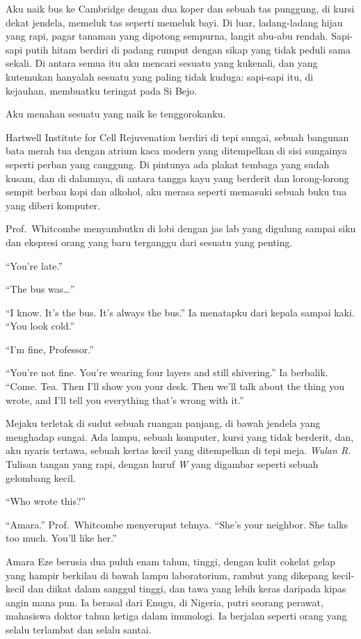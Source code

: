 \documentclass[11pt,twoside,openany]{book}
\makeatletter
\newcommand{\scenebreak}{\par\vspace{0.9em}{\centering\textsc{*\hspace{0.7em}*\hspace{0.7em}*}\par}\vspace{0.9em}\@afterindentfalse\@afterheading}
\makeatother
\begin{document}
Aku naik bus ke Cambridge dengan dua koper dan sebuah tas punggung, di kursi dekat jendela, memeluk tas seperti memeluk bayi. Di luar, ladang-ladang hijau yang rapi, pagar tanaman yang dipotong sempurna, langit abu-abu rendah. Sapi-sapi putih hitam berdiri di padang rumput dengan sikap yang tidak peduli sama sekali. Di antara semua itu aku mencari sesuatu yang kukenali, dan yang kutemukan hanyalah sesuatu yang paling tidak kuduga: sapi-sapi itu, di kejauhan, membuatku teringat pada Si Bejo.

Aku menahan sesuatu yang naik ke tenggorokanku.

\scenebreak
Hartwell Institute for Cell Rejuvenation berdiri di tepi sungai, sebuah bangunan bata merah tua dengan atrium kaca modern yang ditempelkan di sisi sungainya seperti perban yang canggung. Di pintunya ada plakat tembaga yang sudah kusam, dan di dalamnya, di antara tangga kayu yang berderit dan lorong-lorong sempit berbau kopi dan alkohol, aku merasa seperti memasuki sebuah buku tua yang diberi komputer.

Prof.~Whitcombe menyambutku di lobi dengan jas lab yang digulung sampai siku dan ekspresi orang yang baru terganggu dari sesuatu yang penting.

``You're late.''

``The bus was\ldots{}''

``I know. It's the bus. It's always the bus.'' Ia menatapku dari kepala sampai kaki. ``You look cold.''

``I'm fine, Professor.''

``You're not fine. You're wearing four layers and still shivering.'' Ia berbalik. ``Come. Tea. Then I'll show you your desk. Then we'll talk about the thing you wrote, and I'll tell you everything that's wrong with it.''

Mejaku terletak di sudut sebuah ruangan panjang, di bawah jendela yang menghadap sungai. Ada lampu, sebuah komputer, kursi yang tidak berderit, dan, aku nyaris tertawa, sebuah kertas kecil yang ditempelkan di tepi meja. \emph{Wulan R.} Tulisan tangan yang rapi, dengan huruf \emph{W} yang digambar seperti sebuah gelombang kecil.

``Who wrote this?''

``Amara.'' Prof.~Whitcombe menyeruput tehnya. ``She's your neighbor. She talks too much. You'll like her.''

\scenebreak
Amara Eze berusia dua puluh enam tahun, tinggi, dengan kulit cokelat gelap yang hampir berkilau di bawah lampu laboratorium, rambut yang dikepang kecil-kecil dan diikat dalam sanggul tinggi, dan tawa yang lebih keras daripada kipas angin mana pun. Ia berasal dari Enugu, di Nigeria, putri seorang perawat, mahasiswa doktor tahun ketiga dalam imunologi. Ia berjalan seperti orang yang selalu terlambat dan selalu santai.
\end{document}
